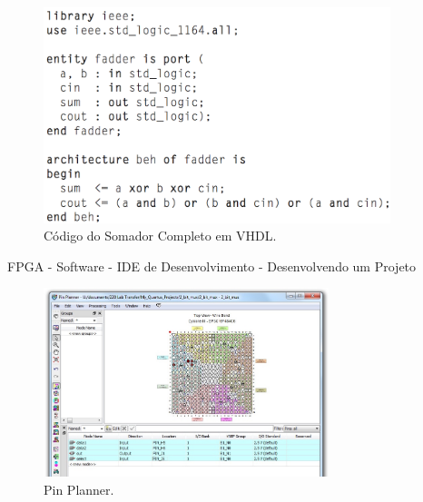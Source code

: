 \documentclass[aspectratio=169]{beamer}
\begin{document}
	\begin{frame}%
		\begin{figure}[p]
			\centering
			\includegraphics[width=0.9\textwidth]{img/fpga/code_vhdl.png}
			\caption{Código do Somador Completo em VHDL.}
			\label{fig:codigo_vhdl}
		\end{figure}
	\end{frame}
	
	
	\begin{frame}{FPGA - Software - IDE de Desenvolvimento - Desenvolvendo um Projeto}
		\begin{figure}[p]
			\centering
			\includegraphics[width=0.74\textwidth]{img/fpga/software_quartus_pin.jpg}
			\caption{Pin Planner.}
			\label{fig:alteraquartus_pinagem}
		\end{figure}
	\end{frame}
	
\end{document}

